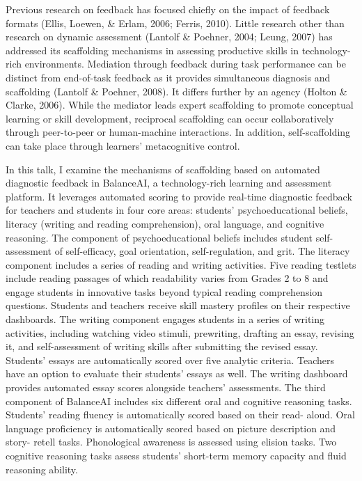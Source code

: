 \documentclass[
]{book}
\begin{document}
Previous research on feedback has focused chiefly on the impact of feedback formats (Ellis, Loewen, \& Erlam, 2006; Ferris, 2010). Little research other than research on dynamic assessment (Lantolf \& Poehner, 2004; Leung, 2007) has addressed its scaffolding mechanisms in assessing productive skills in technology-rich environments. Mediation through feedback during task performance can be distinct from end-of-task feedback as it provides simultaneous diagnosis and scaffolding (Lantolf \& Poehner, 2008). It differs further by an agency (Holton \& Clarke, 2006). While the mediator leads expert scaffolding to promote conceptual learning or skill development, reciprocal scaffolding can occur collaboratively through peer-to-peer or human-machine interactions. In addition, self-scaffolding can take place through learners' metacognitive control.

In this talk, I examine the mechanisms of scaffolding based on automated diagnostic feedback in BalanceAI, a technology-rich learning and assessment platform. It leverages automated scoring to provide real-time diagnostic feedback for teachers and students in four core areas: students' psychoeducational beliefs, literacy (writing and reading comprehension), oral language, and cognitive reasoning. The component of psychoeducational beliefs includes student self-assessment of self-efficacy, goal orientation, self-regulation, and grit. The literacy component includes a series of reading and writing activities. Five reading testlets include reading passages of which readability varies from Grades 2 to 8 and engage students in innovative tasks beyond typical reading comprehension questions. Students and teachers receive skill mastery profiles on their respective dashboards. The writing component engages students in a series of writing activities, including watching video stimuli, prewriting, drafting an essay, revising it, and self-assessment of writing skills after submitting the revised essay. Students' essays are automatically scored over five analytic criteria. Teachers have an option to evaluate their students' essays as well. The writing dashboard provides automated essay scores alongside teachers' assessments. The third component of BalanceAI includes six different oral and cognitive reasoning tasks. Students' reading fluency is automatically scored based on their read- aloud. Oral language proficiency is automatically scored based on picture description and story- retell tasks. Phonological awareness is assessed using elision tasks. Two cognitive reasoning tasks assess students' short-term memory capacity and fluid reasoning ability.
\end{document}
